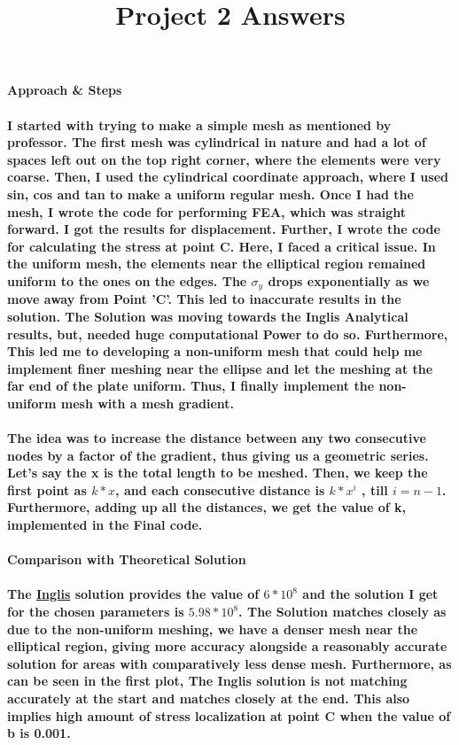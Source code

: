 \documentclass{article}
\begin{document}
\title{Project 2 Answers}	

\paragraph*{Approach \& Steps}
\paragraph{I started with trying to make a simple mesh as mentioned by professor. The first mesh was cylindrical in nature and had a lot of spaces left out on the top right corner, where the elements were very coarse. Then, I used the cylindrical coordinate approach, where I used sin, cos and tan to make a uniform regular mesh. Once I had the mesh, I wrote the code for performing FEA, which was straight forward. I got the results for displacement. Further, I wrote the code for calculating the stress at point C. Here, I faced a critical issue. In the uniform mesh, the elements near the elliptical region remained uniform to the ones on the edges. The $\sigma_y$ drops exponentially as we move away from Point 'C'. This led to inaccurate results in the solution. The Solution was moving towards the Inglis Analytical results, but, needed huge computational Power to do so. Furthermore, This led me to developing a non-uniform mesh that could help me implement finer meshing near the ellipse and let the meshing at the far end of the plate uniform. Thus, I finally implement the non-uniform mesh with a mesh gradient.}

\paragraph{The idea was to increase the distance between any two consecutive nodes by a factor of the gradient, thus giving us a geometric series. Let's say the x is the total length to be meshed. Then, we keep the first point as $ k*x $, and each consecutive distance is $ k*x^i$ , till $i = n-1 $. Furthermore, adding up all the distances, we get the value of k, implemented in the Final code.}

\paragraph*{Comparison with Theoretical Solution}

\paragraph{The \underline{Inglis} solution provides the value of $ 6 * 10^8 $ and the solution I get for the chosen parameters is $ 5.98 * 10 ^ 8 $. The Solution matches closely as due to the non-uniform meshing, we have a denser mesh near the elliptical region, giving more accuracy alongside a reasonably accurate solution for areas with comparatively less dense mesh. Furthermore, as can be seen in the first plot, The Inglis solution is not matching accurately at the start and matches closely at the end. This also implies high amount of stress localization at point C when the value of b is 0.001.}
\end{document}
